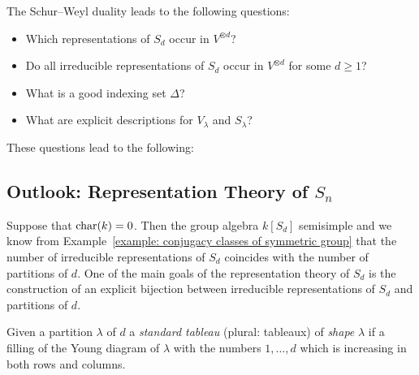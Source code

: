 \begin{fluff}
  The Schur--Weyl duality leads to the following questions:
  \begin{itemize}
    \item
      Which representations of $S_d$ occur in $V^{\otimes d}$?
    \item
      Do all irreducible representations of $S_d$ occur in $V^{\otimes d}$ for some $d \geq 1$?
    \item
      What is a good indexing set $\Delta$?
    \item
      What are explicit descriptions for $V_\lambda$ and $S_\lambda$?
  \end{itemize}
  These questions lead to the following:
\end{fluff}





\subsection*{Outlook: Representation Theory of $S_n$}


\begin{fluff}
  Suppose that $\operatorname{char}(k) = 0$.
  Then the group algebra $k[S_d]$ semisimple and we know from Example~\ref{example: conjugacy classes of symmetric group} that the number of irreducible representations of $S_d$ coincides with the number of partitions of $d$.
  One of the main goals of the representation theory of $S_d$ is the construction of an explicit bijection between irreducible representations of $S_d$ and partitions of $d$.
\end{fluff}


\begin{definition}
  Given a partition $\lambda$ of $d$ a \emph{standard tableau} (plural: tableaux) of \emph{shape} $\lambda$ if a filling of the Young diagram of $\lambda$ with the numbers $1, \dotsc, d$ which is increasing in both rows and columns.
\end{definition}


